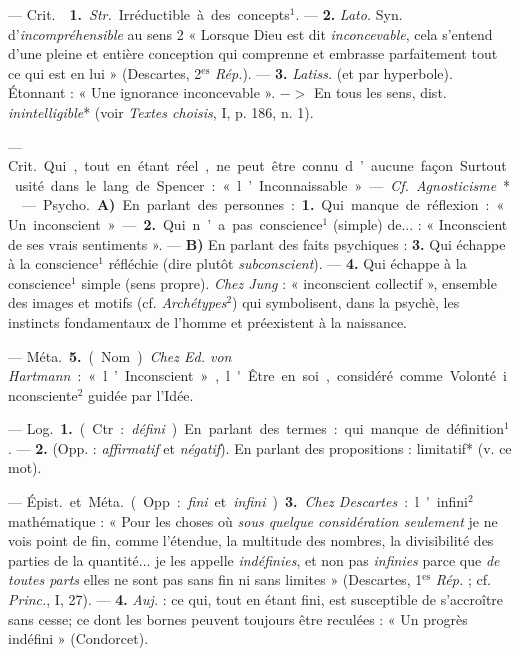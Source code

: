 \begin{itemize}[leftmargin=1cm, label=, itemsep=1pt]
 — \si{Crit.}  {\bf 1.} {\it Str.}
Irréductible à des concepts$^1$. — {\bf 2.} {\it Lato.} Syn.
d'{\it incompréhensible} au sens 2 « Lorsque Dieu est dit {\it inconcevable},
cela s'entend d’une pleine et entière conception qui comprenne et embrasse
parfaitement tout ce qui est en lui » (Descartes, 2$^\text{es}$ {\it Rép.}).
—  {\bf 3.} {\it Latiss.} (et par hyperbole). Étonnant : « Une
ignorance inconcevable ». $->$ En tous les sens, dist. {\it inintelligible}*
(voir {\it Textes choisis}, I, p. 186, n. 1).

 — \si{Crit.} Qui, tout en étant réel, ne peut être connu
d’aucune façon. Surtout usité dans le lang. de Spencer : « l’Inconnaissable ».
— {\it Cf.} {\it Agnosticisme}*.

 — \si{Psycho.} {\bf A)} En parlant des personnes : {\bf 1.}
Qui manque de réflexion : « Un inconscient » —  {\bf 2.} Qui n’a pas
conscience$^1$ (simple) de... : « Inconscient de ses vrais sentiments ». —
{\bf B)} En parlant des faits psychiques : {\bf 3.} Qui échappe à la
conscience$^1$ réfléchie (dire plutôt {\it subconscient}). — {\bf 4.} Qui
échappe à la conscience$^1$ simple (sens propre). {\it Chez Jung} :
« inconscient collectif », ensemble des images et motifs (cf.
{\it Archétypes}$^2$) qui symbolisent, dans la psychè, les instincts
fondamentaux de l’homme et préexistent à la naissance.

— \si{Méta.} {\bf 5.} (Nom). {\it Chez Ed. von Hartmann} : « l’Inconscient »,
l'Être en soi, considéré comme Volonté inconsciente$^2$ guidée par l'Idée.

 — \si{Log.} {\bf 1.} (Ctr. : {\it défini}). En parlant des
termes : qui manque de définition$^1$. — {\bf 2.} (Opp. :
{\it affirmatif}
et {\it négatif}). En parlant des propositions : limitatif* (v. ce mot).

— \si{Épist.} et \si{Méta.} (Opp. : {\it fini} et {\it infini}).
{\bf 3.} {\it Chez Descartes} : l'infini$^2$ mathématique : « Pour les choses
où {\it sous quelque considération seulement} je ne vois point de fin, comme
l’étendue, la multitude des nombres, la divisibilité des parties de la
quantité... je les appelle {\it indéfinies}, et non pas {\it infinies} parce
que {\it de toutes parts} elles ne sont pas sans fin ni sans
limites » (Descartes, 1$^\text{es}$ {\it Rép.} ; cf. {\it Princ.}, I, 27). —
{\bf 4.} {\it Auj.} : ce qui, tout en étant fini, est susceptible de
s’accroître sans cesse; ce dont les bornes peuvent toujours être reculées :
« Un progrès indéfini » (Condorcet).


\end{itemize}

